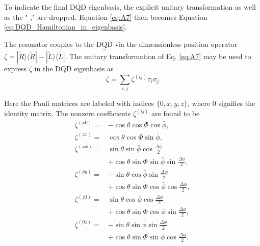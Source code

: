 \documentclass[12pt]{article}
\begin{document}
To indicate the final DQD eigenbasis, the explicit unitary transformation as well as the " ," are dropped. Equation \ref{eq:A7} then becomes Equation \ref{eq:DQD_Hamiltonian_in_eigenbasis}.

The resonator couples to the $\underset{\sim}{\mathrm{DQD}}$ via the dimensionless position operator $\zeta=|\widetilde{R}\rangle\langle\widetilde{R}|-| \widetilde{L}\rangle\langle\widetilde{L}|$. 
The unitary transformation of Eq. \ref{eq:A7} may be used to express $\zeta$ in the DQD eigenbasis as
$$
\zeta=\sum_{i, j} \zeta^{(i j)} \tau_i \sigma_j
$$

Here the Pauli matrices are labeled with indices $\{0, x, y, z\}$, where 0 signifies the identity matrix. The nonzero coefficients
$\zeta^{(i j)}$ are found to be
\begin{equation}\label{eq:A10}
    \begin{aligned}
        \zeta^{(x 0)}= & -\cos \theta \cos \Phi \cos \bar{\phi}, \\
        \zeta^{(z x)}= & \cos \theta \cos \Phi \sin \bar{\phi}, \\
        \zeta^{(x x)}= & \sin \theta \sin \bar{\phi} \cos \frac{\Delta \phi}{2} \\
        & +\cos \theta \sin \Phi \sin \bar{\phi} \sin \frac{\Delta \phi}{2}, \\
        \zeta^{(y y)}= & -\sin \theta \cos \bar{\phi} \sin \frac{\Delta \phi}{2} \\
        & +\cos \theta \sin \Phi \cos \bar{\phi} \cos \frac{\Delta \phi}{2}, \\
        \zeta^{(z 0)}= & \sin \theta \cos \bar{\phi} \cos \frac{\Delta \phi}{2} \\
        & +\cos \theta \sin \Phi \cos \bar{\phi} \sin \frac{\Delta \phi}{2}, \\
        \zeta^{(0 z)}= & -\sin \theta \sin \bar{\phi} \sin \frac{\Delta \phi}{2} \\
        & +\cos \theta \sin \Phi \sin \bar{\phi} \cos \frac{\Delta \phi}{2} .
        \end{aligned}
\end{equation}
\end{document}

